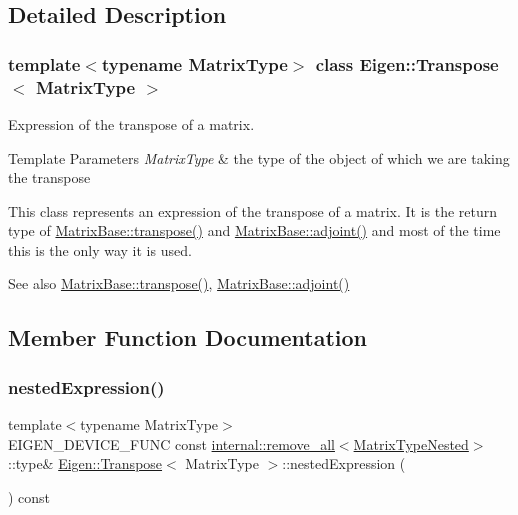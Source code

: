 \subsection{Detailed Description}
\subsubsection*{template$<$typename Matrix\+Type$>$\newline
class Eigen\+::\+Transpose$<$ Matrix\+Type $>$}

Expression of the transpose of a matrix. 


\begin{DoxyTemplParams}{Template Parameters}
{\em Matrix\+Type} & the type of the object of which we are taking the transpose\\
\hline
\end{DoxyTemplParams}
This class represents an expression of the transpose of a matrix. It is the return type of \mbox{\hyperlink{class_eigen_1_1_dense_base_ac8952c19644a4ac7e41bea45c19b909c}{Matrix\+Base\+::transpose()}} and \mbox{\hyperlink{class_eigen_1_1_matrix_base_afacca1f88da57e5cd87dd07c8ff926bb}{Matrix\+Base\+::adjoint()}} and most of the time this is the only way it is used.

\begin{DoxySeeAlso}{See also}
\mbox{\hyperlink{class_eigen_1_1_dense_base_ac8952c19644a4ac7e41bea45c19b909c}{Matrix\+Base\+::transpose()}}, \mbox{\hyperlink{class_eigen_1_1_matrix_base_afacca1f88da57e5cd87dd07c8ff926bb}{Matrix\+Base\+::adjoint()}} 
\end{DoxySeeAlso}


\subsection{Member Function Documentation}
\mbox{\label{class_eigen_1_1_transpose_a72aefbf67f5e3caf62a99f73409b4a63}} 
\subsubsection{\texorpdfstring{nestedExpression()}{nestedExpression()}\hspace{0.1cm}{\footnotesize\ttfamily [1/2]}}
{\footnotesize\ttfamily template$<$typename Matrix\+Type$>$ \\
E\+I\+G\+E\+N\+\_\+\+D\+E\+V\+I\+C\+E\+\_\+\+F\+U\+NC const \mbox{\hyperlink{struct_eigen_1_1internal_1_1remove__all}{internal\+::remove\+\_\+all}}$<$\mbox{\hyperlink{struct_eigen_1_1internal_1_1true__type}{Matrix\+Type\+Nested}}$>$\+::type\& \mbox{\hyperlink{class_eigen_1_1_transpose}{Eigen\+::\+Transpose}}$<$ Matrix\+Type $>$\+::nested\+Expression (\begin{DoxyParamCaption}{ }\end{DoxyParamCaption}) const\hspace{0.3cm}{\ttfamily [inline]}}


